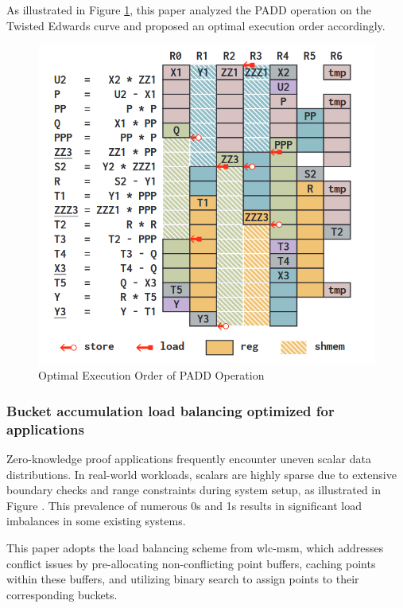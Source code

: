 \documentclass[conference]{IEEEtran}
\begin{document}
As illustrated in Figure \ref{fig:padd-register}, this paper analyzed the PADD operation on the Twisted Edwards curve and proposed an optimal execution order accordingly.

\begin{figure}[h]
    \centering
    \label{fig:padd-register}
    \includegraphics[width=1\linewidth]{image/padd_register.png}
    \caption{Optimal Execution Order of PADD Operation}
\end{figure}

\subsubsection{\textbf{Bucket accumulation load balancing optimized for applications}}
Zero-knowledge proof applications frequently encounter uneven scalar data distributions. In real-world workloads, scalars are highly sparse due to extensive boundary checks and range constraints during system setup, as illustrated in Figure \todo{}. This prevalence of numerous 0s and 1s results in significant load imbalances in some existing systems.

This paper adopts the load balancing scheme from wlc-msm, which addresses conflict issues by pre-allocating non-conflicting point buffers, caching points within these buffers, and utilizing binary search to assign points to their corresponding buckets.
\end{document}
